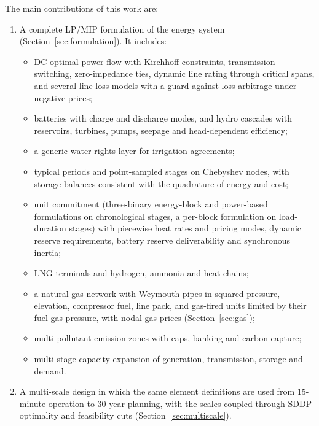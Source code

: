 The main contributions of this work are:

\begin{enumerate}
  \item A complete LP/MIP formulation of the energy system
    (Section~\ref{sec:formulation}).  It includes:
    \begin{itemize}
      \item DC optimal power flow with Kirchhoff constraints,
        transmission switching, zero-impedance ties, dynamic line
        rating through critical spans, and several line-loss models
        with a guard against loss arbitrage under negative prices;
      \item batteries with charge and discharge modes, and hydro
        cascades with reservoirs, turbines, pumps, seepage and
        head-dependent efficiency;
      \item a generic water-rights layer for irrigation agreements;
      \item typical periods and point-sampled stages on Chebyshev
        nodes, with storage balances consistent with the quadrature of
        energy and cost;
      \item unit commitment (three-binary energy-block and power-based
        formulations on chronological stages, a per-block formulation
        on load-duration stages) with
        piecewise heat rates and pricing modes, dynamic reserve
        requirements, battery reserve deliverability and synchronous
        inertia;
      \item LNG terminals and hydrogen, ammonia and heat chains;
      \item a natural-gas network with Weymouth pipes in squared
        pressure, elevation, compressor fuel, line pack, and
        gas-fired units limited by their fuel-gas pressure, with
        nodal gas prices (Section~\ref{sec:gas});
      \item multi-pollutant emission zones with caps, banking and
        carbon capture;
      \item multi-stage capacity expansion of generation, transmission,
        storage and demand.
    \end{itemize}

  \item A multi-scale design in which the same element definitions are
    used from 15-minute operation to 30-year planning, with the scales
    coupled through SDDP optimality and feasibility cuts
    (Section~\ref{sec:multiscale}).


\end{enumerate}
